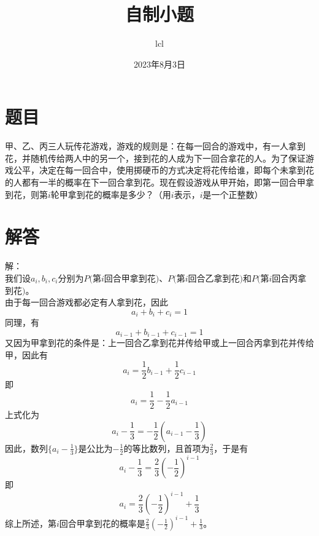 \documentclass[11pt]{article}
\title{自制小题}
\date{2023年8月3日}
\author{lcl}
\begin{document}
\maketitle
\section*{题目}
甲、乙、丙三人玩传花游戏，游戏的规则是：在每一回合的游戏中，有一人拿到花，并随机传给两人中的另一个，接到花的人成为下一回合拿花的人。为了保证游戏公平，决定在每一回合中，使用掷硬币的方式决定将花传给谁，即每个未拿到花的人都有一半的概率在下一回合拿到花。现在假设游戏从甲开始，即第一回合甲拿到花，则第$i$轮甲拿到花的概率是多少？（用$i$表示，$i$是一个正整数）
\section*{解答}
解：\\
我们设$a_i,b_i,c_i$分别为$P($第$i$回合甲拿到花$)$、$P($第$i$回合乙拿到花$)$和$P($第$i$回合丙拿到花$)$。\\
由于每一回合游戏都必定有人拿到花，因此$$a_i+b_i+c_i=1$$
同理，有$$a_{i-1}+b_{i-1}+c_{i-1}=1$$
又因为甲拿到花的条件是：上一回合乙拿到花并传给甲或上一回合丙拿到花并传给甲，因此有$$a_i=\frac{1}{2}b_{i-1}+\frac{1}{2}c_{i-1}$$
即$$a_i=\frac{1}{2}-\frac{1}{2}a_{i-1}$$
上式化为$$a_i-\frac{1}{3}=-\frac{1}{2}(a_{i-1}-\frac{1}{3})$$
因此，数列$\{a_i-\frac{1}{3}\}$是公比为$-\frac{1}{2}$的等比数列，且首项为$\frac{2}{3}$，于是有
$$a_i-\frac{1}{3}=\frac{2}{3}(-\frac{1}{2})^{i-1}$$
即$$a_i=\frac{2}{3}(-\frac{1}{2})^{i-1}+\frac{1}{3}$$
综上所述，第$i$回合甲拿到花的概率是$\frac{2}{3}(-\frac{1}{2})^{i-1}+\frac{1}{3}$。
\end{document}
